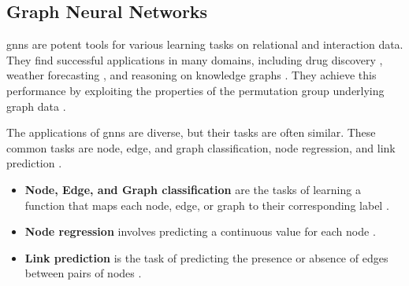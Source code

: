 

\subsection{Graph Neural Networks}
\label{s_Background_GNNs}



\glspl{gnn} are potent tools for various learning tasks on relational and interaction data. They find successful applications in many domains, including drug discovery \cite{dauparas_robust_2022}, weather forecasting \cite{lam_graphcast_2022}, and reasoning on knowledge graphs \cite{huang_few-shot_2022}. They achieve this performance by exploiting the properties of the permutation group underlying graph data \cite{bronstein_geometric_2021}.

The applications of \glspl{gnn} are diverse, but their tasks are often similar. These common tasks are node, edge, and graph classification, node regression, and link prediction \cite{wu_comprehensive_2021, zhou_graph_2020}.
\begin{itemize}
    \item \textbf{Node, Edge, and Graph classification} are the tasks of learning a function that maps each node, edge, or graph to their corresponding label \cite{kipf_semi-supervised_2017}.
    \item \textbf{Node regression} involves predicting a continuous value for each node \cite{thomas_graph_2023}.
    \item \textbf{Link prediction} is the task of predicting the presence or absence of edges between pairs of nodes \cite{liben-nowell_link-prediction_2007}.
\end{itemize}

